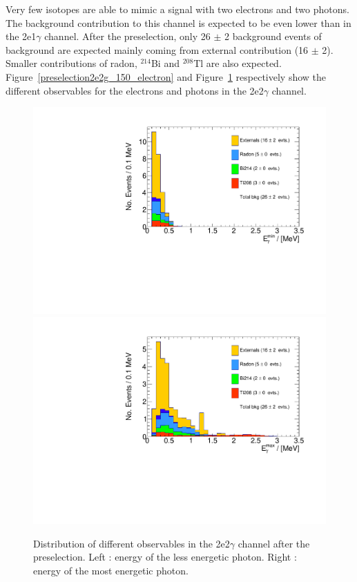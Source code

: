 \documentclass[main.tex]{subfiles}
\begin{document}
\NI Very few isotopes are able to mimic a signal with two electrons and two photons. The background contribution to this channel is expected to be even lower than in the 2e1$\gamma$ channel. After the preselection, only 26 $\pm$ 2 background events of background are expected mainly coming from external contribution (16 $\pm$ 2). Smaller contributions of radon, $^{\text{214}}$Bi and $^{\text{208}}$Tl are also expected. Figure~\ref{preselection2e2g_150_electron} and Figure~\ref{preselection2e2g_150_gamma} respectively show the different observables for the electrons and photons in the 2e2$\gamma$ channel.


\begin{figure}[h!]
\centering
\includegraphics[scale=0.35]{pictures/FinalResults/bb2nu2/150/preselection/preSelection2e2gBKG_min_gmc_energy.pdf}
\includegraphics[scale=0.35]{pictures/FinalResults/bb2nu2/150/preselection/preSelection2e2gBKG_max_gmc_energy.pdf}
\caption{Distribution of different observables in the 2e2$\gamma$ channel after the preselection. Left : energy of the less energetic photon. Right : energy of the most energetic photon.}
\label{preselection2e2g_150_gamma}
\end{figure}
\end{document}
